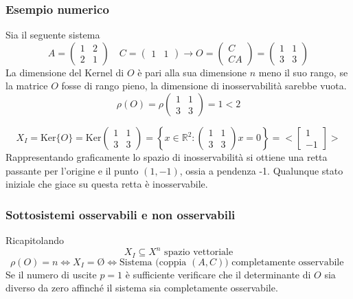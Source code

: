 \subsubsection{Esempio numerico}
Sia il seguente sistema
$$
A= \begin{pmatrix}
1 & 2 \\
2 & 1
\end{pmatrix}\quad
C= \begin{pmatrix}
1 & 1
\end{pmatrix} \longrightarrow
O = \begin{pmatrix}
C \\ CA
\end{pmatrix} =
\begin{pmatrix}
1 & 1 \\
3 & 3
\end{pmatrix}
$$
La dimensione del Kernel di $O$ è pari alla sua dimensione $n$ meno il suo
rango, se la matrice $O$ fosse di rango pieno, la dimensione di inosservabilità
sarebbe vuota.
$$
\rho(O) = \rho
\begin{pmatrix}
1 & 1 \\
3 & 3
\end{pmatrix}
=1 < 2$$

$$
X_I = \text{Ker}\{O\} = \text{Ker}\begin{pmatrix}
1 & 1\\
3 & 3
\end{pmatrix} =
\left\{x\in\mathbb{R}^2:\begin{pmatrix}
1 & 1 \\ 3 & 3
\end{pmatrix}x=0\right\} = <\begin{bmatrix}
1 \\ -1
\end{bmatrix}>
$$
Rappresentando graficamente lo spazio di inosservabilità si ottiene una retta
passante per l'origine e il punto $(1,-1)$, ossia a pendenza -1. Qualunque
stato iniziale che giace su questa retta è inosservabile.

\subsubsection{Sottosistemi osservabili e non osservabili}
Ricapitolando
$$
X_I \subseteq X^n \text{ spazio vettoriale}
$$
$$
\rho(O) = n \Leftrightarrow X_I = \text{\O{}} \Leftrightarrow
\text{Sistema (coppia $(A,C)$) completamente osservabile }
$$
Se il numero di uscite $p=1$ è sufficiente verificare che il determinante di
$O$ sia diverso da zero affinché il sistema sia completamente osservabile.

